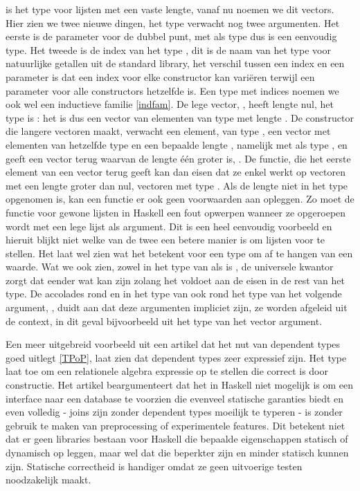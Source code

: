  is het type voor lijsten met een vaste lengte, vanaf nu noemen we
dit vectors. Hier zien we twee nieuwe dingen, het type  verwacht nog
twee argumenten. Het eerste is de parameter voor de dubbel punt,  met
als type  dus  is een eenvoudig type. Het tweede is de
index van het type , dit is de naam van het type voor natuurlijke
getallen uit de standard library, het verschil tussen een index en een
parameter is dat een index voor elke constructor kan variëren terwijl een
parameter voor alle constructors hetzelfde is. Een type met indices noemen we
ook wel een inductieve familie \ref{indfam}. De lege vector, \iagda{[]},
heeft lengte nul, het type is : het is dus een vector van
elementen van type  met lengte . De constructor die
langere vectoren maakt, verwacht een element,  van type , een
vector met elementen van hetzelfde type  en een bepaalde lengte
, namelijk  met als type , en geeft een
vector terug waarvan de lengte één groter is, . De
 functie, die het eerste element van een vector terug geeft kan dan
eisen dat ze enkel werkt op vectoren met een lengte groter dan nul, vectoren
met type . Als de lengte niet in het type opgenomen is,
kan een functie er ook geen voorwaarden aan opleggen. Zo moet de 
functie voor gewone lijsten in Haskell een fout opwerpen wanneer ze opgeroepen
wordt met een lege lijst als argument.  Dit is een heel eenvoudig voorbeeld en
hieruit blijkt niet welke van de twee een betere manier is om lijsten voor te
stellen.  Het laat wel zien wat het betekent voor een type om af te hangen van
een waarde. Wat we ook zien, zowel in het type van  als 
is , de universele kwantor zorgt dat  eender wat kan
zijn zolang het voldoet aan de eisen in de rest van het type. De accolades rond
 en in het type van  ook rond het type van het volgende
argument, , duidt aan dat deze argumenten impliciet zijn, ze
worden afgeleid uit de context, in dit geval bijvoorbeeld uit het type van het
vector argument.

Een meer uitgebreid voorbeeld uit een artikel dat het nut van dependent types
goed uitlegt \ref{TPoP}, laat zien dat dependent types zeer expressief zijn.
Het type  laat toe om een relationele algebra expressie op te stellen
die correct is door constructie. Het artikel beargumenteert dat het in Haskell
niet mogelijk is om een interface naar een database te voorzien die evenveel
statische garanties biedt en even volledig - joins zijn zonder dependent types
moeilijk te typeren - is zonder gebruik te maken van preprocessing of
experimentele features. Dit betekent niet dat er geen libraries bestaan voor
Haskell die bepaalde eigenschappen statisch of dynamisch op leggen, maar wel
dat die beperkter zijn en minder statisch kunnen zijn. Statische correctheid is
handiger omdat ze geen uitvoerige testen noodzakelijk maakt.

